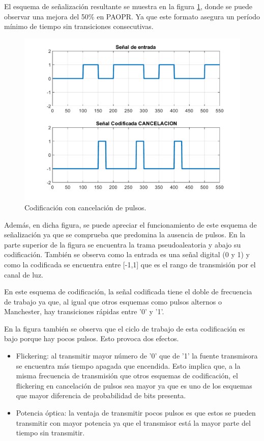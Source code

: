 El esquema de señalización resultante se muestra en la figura \ref{codificación_cancelacion},
donde se puede observar una mejora del 50\% en PAOPR. Ya que este formato asegura un 
período mínimo de tiempo sin transiciones consecutivas.

\begin{figure}[ht]
    \centering
    \includegraphics[scale=0.55]{./figuras/CodificadaCancelacion.pdf}
    \caption{\small{Codificación con cancelación de pulsos.}}
    \label{codificación_cancelacion}%
\end{figure}

Además, en dicha figura, se puede apreciar el funcionamiento de este esquema de señalización 
ya que se comprueba que predomina la ausencia de pulsos. En la parte superior de la figura 
se encuentra la trama pseudoaleatoria y abajo su codificación. También se 
observa como la entrada es una señal digital (0 y 1) y como la codificada se encuentra
entre [-1,1] que es el rango de transmisión por el canal de luz.

En este esquema de codificación, la señal codificada tiene el doble de frecuencia de 
trabajo ya que, al igual que otros esquemas como pulsos alternos o Manchester, hay 
transiciones rápidas entre '0' y '1'. 

En la figura también se observa que el ciclo de trabajo de esta codificación es 
bajo porque hay pocos pulsos. Esto provoca dos efectos.
\begin{itemize}
    \item Flickering: al transmitir mayor número de '0' que de '1' la fuente transmisora
        se encuentra más tiempo apagada que encendida. Esto implica que, a la misma 
        frecuencia de transmisión que otros esquemas de codificación, el flickering en 
        cancelación de pulsos sea mayor ya que es uno de los esquemas que mayor 
        diferencia de probabilidad de bits presenta.
    \item Potencia óptica: la ventaja de transmitir pocos pulsos es que estos se pueden 
        transmitir con mayor potencia ya que el transmisor está la mayor parte del tiempo
        sin transmitir. 
\end{itemize}

